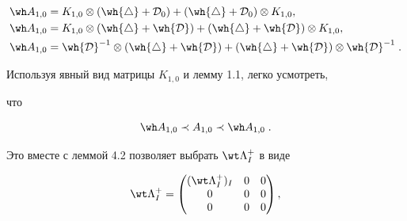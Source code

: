 \begin{equation}


\begin{split}


\label{5.2}


\wh A_{1,0}&=K_{1,0}\otimes (\wh {\bigtriangleup} +{\cal D}_0)+(\wh 


{\bigtriangleup} +{\cal D}_0)\otimes K_{1,0}, \\ 


\wh A_{1,0}&=K_{1,0}\otimes (\wh {\bigtriangleup} +\wh {\cal D})+(\wh


{\bigtriangleup} +\wh {\cal D})\otimes K_{1,0}, \\


\wh A_{1,0}&=\wh {\cal D}^{-1}\otimes (\wh {\bigtriangleup} +\wh {\cal 


D})+(\wh {\bigtriangleup} +\wh {\cal D})\otimes \wh {\cal D}^{-1} \;. \\


\end{split}


\end{equation}


Используя явный вид матрицы $K_{1,0}$ и лемму 1.1, легко усмотреть, 


что 


\begin{equation}


{\wh A}_{1,0}\prec A_{1,0}\prec {\wh A}_{1,0} \;.


\label{5.3}


\end{equation}


Это вместе с леммой 4.2 позволяет выбрать $\wt \Lambda_{I}^+$ в виде


\begin{equation}


\wt \Lambda_{I}^+=


\begin{pmatrix}


(\wt \Lambda_I^+)_I & 0 & 0 \\


0 & 0 & 0 \\


0 & 0 & 0


\end{pmatrix}


,


\label{5.70}


\end{equation} 


